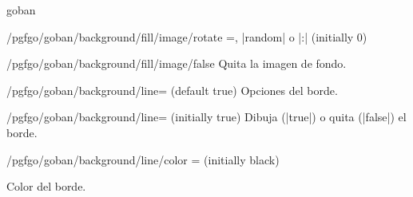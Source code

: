 \begin{environment}{{goban}}
\begin{key}{/pgfgo/goban/background/fill/image/rotate =, |random| o |:| (initially 0)}
		\begin{codeexample}[]
			\begin{goban}[5, background = {fill = {image = {
				file = pgfgo-board.jpg, rotate = 90}}}]
			\end{goban}

			\begin{goban}[5, background = {fill = {image = {
				file = pgfgo-board.jpg, fit = tile, width = 1cm, rotate = random}}}]
			\end{goban}
		\end{codeexample}
	\end{key}

	\begin{stylekey}{/pgfgo/goban/background/fill/image/false}
		Quita la imagen de fondo.
	\end{stylekey}

	\begin{key}{/pgfgo/goban/background/line= (default true)}
		Opciones del borde.
	\end{key}
	
	\begin{key}{/pgfgo/goban/background/line= (initially true)}
		Dibuja (|true|) o quita (|false|) el borde.
		
		\begin{codeexample}[]
			
			\begin{goban}[background = {line = {color = red}}, name = a]
			\end{goban}
			
			\begin{goban}[background = {line = false}, resume = a]
			\end{goban}
		\end{codeexample}
	\end{key}
	
	\begin{key}{/pgfgo/goban/background/line/color = (initially black)}
		
		Color del borde.
		
		\begin{codeexample}[]
			
			\begin{goban}[background = {line = {color = red}}, name = a]
			\end{goban}
			

\end{codeexample}
\end{key}
\end{environment}
